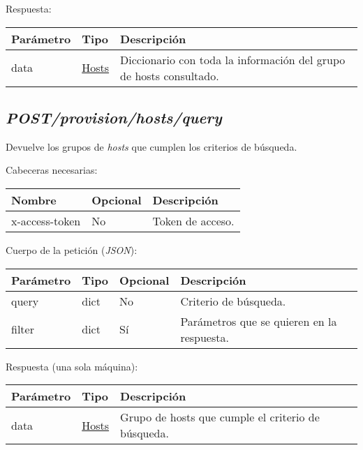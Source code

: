 Respuesta:

\begin{table}[h!]
	\centering
	\begin{adjustbox}{max width=\textwidth}
	\begin{tabularx}{\linewidth}{|l|l|L|}
		\hline
		Parámetro & Tipo & Descripción \\ \hline
		data & \hyperref[sec:hosts]{Hosts} & Diccionario con toda la información del grupo de hosts consultado. \\ \hline
	\end{tabularx}
\end{adjustbox}
\end{table}


\pagebreak
\subsection{\textit{POST/provision/hosts/query}}

Devuelve los grupos de \textit{hosts} que cumplen los criterios de búsqueda.

Cabeceras necesarias:

\begin{table}[h!]
	\centering
	\begin{adjustbox}{max width=\textwidth}
	\begin{tabular}{|l|l|l|}
		\hline
		Nombre & Opcional & Descripción \\ \hline
		x-access-token & No & Token de acceso. \\ \hline
	\end{tabular}
\end{adjustbox}
\end{table}

Cuerpo de la petición (\textit{JSON}):
\begin{table}[h!]
	\centering
	\begin{adjustbox}{max width=\textwidth}
	\begin{tabular}{|l|l|l|l|}
		\hline
		Parámetro & Tipo & Opcional & Descripción \\ \hline
		query & dict & No & Criterio de búsqueda. \\ \hline
		filter & dict & Sí & Parámetros que se quieren en la respuesta. \\ \hline
	\end{tabular}
\end{adjustbox}
\end{table}

Respuesta (una sola máquina):
\begin{table}[h!]
	\centering
	\begin{adjustbox}{max width=\textwidth}
	\begin{tabular}{|l|l|l|}
		\hline
		Parámetro & Tipo & Descripción \\ \hline
		data & \hyperref[sec:hosts]{Hosts} & Grupo de hosts que cumple el criterio de búsqueda. \\ \hline
	\end{tabular}
\end{adjustbox}
\end{table}

